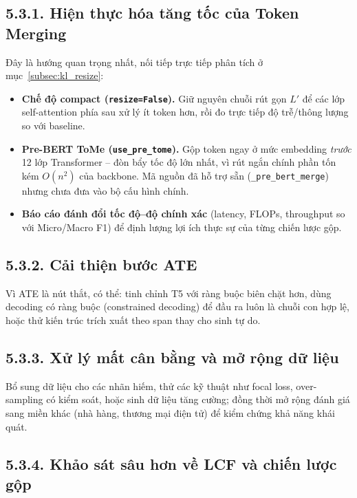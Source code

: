 \subsection{5.3.1. Hiện thực hóa tăng tốc của Token Merging}

Đây là hướng quan trọng nhất, nối tiếp trực tiếp phân tích ở
mục~\ref{subsec:kl_resize}:

\begin{itemize}
  \item \textbf{Chế độ compact (\texttt{resize=False}).} Giữ nguyên chuỗi
        rút gọn $L'$ để các lớp self-attention phía sau xử lý ít token
        hơn, rồi đo trực tiếp độ trễ/thông lượng so với baseline.
  \item \textbf{Pre-BERT ToMe (\texttt{use\_pre\_tome}).} Gộp token ngay ở
        mức embedding \emph{trước} 12 lớp Transformer -- đòn bẩy tốc độ
        lớn nhất, vì rút ngắn chính phần tốn kém $O(n^2)$ của backbone.
        Mã nguồn đã hỗ trợ sẵn (\texttt{\_pre\_bert\_merge}) nhưng chưa
        đưa vào bộ cấu hình chính.
  \item \textbf{Báo cáo đánh đổi tốc độ--độ chính xác} (latency, FLOPs,
        throughput so với Micro/Macro F1) để định lượng lợi ích thực sự
        của từng chiến lược gộp.
\end{itemize}

\subsection{5.3.2. Cải thiện bước ATE}

Vì ATE là nút thắt, có thể: tinh chỉnh T5 với ràng buộc biên chặt hơn,
dùng decoding có ràng buộc (constrained decoding) để đầu ra luôn là chuỗi
con hợp lệ, hoặc thử kiến trúc trích xuất theo span thay cho sinh tự do.

\subsection{5.3.3. Xử lý mất cân bằng và mở rộng dữ liệu}

Bổ sung dữ liệu cho các nhãn hiếm, thử các kỹ thuật như focal loss,
over-sampling có kiểm soát, hoặc sinh dữ liệu tăng cường; đồng thời mở
rộng đánh giá sang miền khác (nhà hàng, thương mại điện tử) để kiểm chứng
khả năng khái quát.

\subsection{5.3.4. Khảo sát sâu hơn về LCF và chiến lược gộp}

